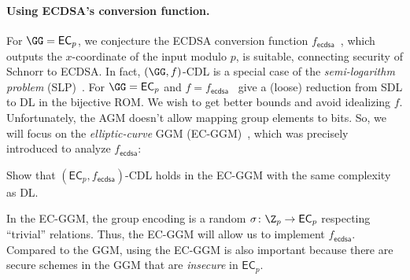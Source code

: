 \paragraph*{Using ECDSA's conversion function.} For   $\GG = \mathsf{EC}_p$, we conjecture  the ECDSA conversion function  $f_{\mathsf{ecdsa}}$~\cite{ecdsa}, which outputs the $x$-coordinate of the input  modulo $p$, is  suitable,  connecting security of Schnorr to ECDSA.  In fact, 
  $(\GG,f)$-CDL is  a special case of the \emph{semi-logarithm problem} (SLP)~\cite[Definition 6]{TCC:FerKilPoe17}. %
For  $\GG = \mathsf{EC}_p$ and $f = f_{\mathsf{ecdsa}}$~\cite{TCC:FerKilPoe17}  give a (loose)  reduction from SDL to DL in the bijective ROM. %
We wish to get better bounds and avoid idealizing $f$. Unfortunately,  the AGM doesn't allow mapping group elements to bits. So, we will focus on the \emph{elliptic-curve} GGM (EC-GGM)~\cite{EC:GroSho22}, which was precisely   introduced to analyze $f_{\mathsf{ecdsa}}$:
\begin{task}
   Show that $(\mathsf{EC}_p,f_{\mathsf{ecdsa}})$-CDL holds in the EC-GGM with the same complexity as DL.
\end{task}


In the EC-GGM, the group encoding is a random  $\sigma \colon \Z_p \to \mathsf{EC}_p$ respecting ``trivial'' relations. Thus, the EC-GGM will  allow us to implement $f_{\mathsf{ecdsa}}$. Compared to the  GGM, using the EC-GGM is also important  because there are secure schemes in the GGM that are \emph{insecure}  in $\mathsf{EC}_p$.  %

